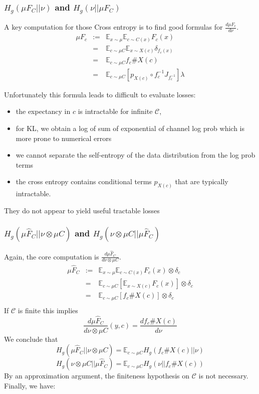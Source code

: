\documentclass[a4paper,10pt]{article}
\def\EE{\mathbb{E}}
\def\ChannelSpace{\mathcal{C}}
\begin{document}
 \subsubsection{$H_g(\mu F_C || \nu)$ and $H_g(\nu||\mu F_C)$}
A key computation for those Cross entropy is to find good formulas for  $\frac{d \mu F_c}{d \nu}$.
\begin{eqnarray}
 \mu F_c &:=& \EE_{x\sim \mu}\EE_{c\sim  C(x)} F_c(x) \\
 &=& \EE_{c\sim  \mu C}\EE_{x\sim X(c)} \delta_{f_c(x)} \\
 &=& \EE_{c\sim  \mu C}f_c\# X(c) \\
 &=& \EE_{c\sim  \mu C} \left[p_{X(c)} \circ f_c^{-1} J_{f_c^{-1}}\right] \lambda
\end{eqnarray}

Unfortunately this formula leads to difficult to evaluate losses:
\begin{itemize}
 \item the expectancy in $c$  is intractable for infinite $\ChannelSpace$,
 \item for KL, we obtain a log of sum of exponential of channel log prob which is more prone to numerical errors
 \item we cannot separate the self-entropy of the data distribution from the log prob terms
 \item the cross entropy contains conditional terms $p_{X(c)}$ that are typically intractable.
\end{itemize}
They do not appear to yield useful tractable losses

\subsubsection{$H_g(\mu \widehat F_C || \nu \otimes \mu C)$ and $H_g( \nu \otimes \mu C || \mu \widehat F_C)$}

    Again, the core computation is $\frac{d \mu \widehat F_C}{d\nu\otimes \mu C}$.
    \begin{eqnarray}
        \mu \widehat F_C &:=& \EE_{x\sim \mu} \EE_{c\sim C(x)} F_c(x)\otimes\delta_c \\
        &=& \EE_{c\sim \mu C} \left[\EE_{x\sim X(c)} F_c(x)\right] \otimes \delta_c \\
        &=& \EE_{c\sim \mu C} \left[f_c\# X(c)\right] \otimes \delta_c \\
    \end{eqnarray}
    If $\mathcal C$ is finite this implies
    $$ \frac{d \mu \widehat F_C}{d \nu\otimes \mu C}(y,c) = \frac{d f_c \# X(c)}{d \nu}$$
    We conclude that
    $$ H_{g}(\mu \widehat F_C || \nu\otimes \mu C) = \EE_{c\sim \mu C} H_{g}(f_c\# X(c) || \nu) $$
    $$ H_{g}( \nu\otimes \mu C || \mu \widehat F_C ) = \EE_{c\sim \mu C} H_{g}(\nu||f_c\# X(c) )  $$
By an approximation argument, the finiteness hypothesis on $\mathcal C$ is not necessary. Finally, we have:
\end{document}
